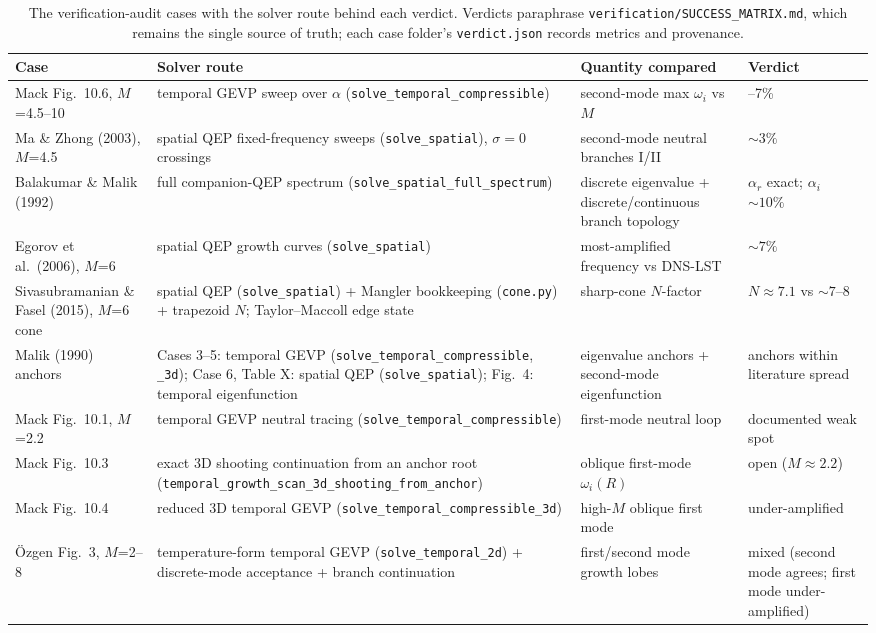 \documentclass[11pt]{article}
\begin{document}
\begin{table}[H]\centering\footnotesize
\renewcommand{\arraystretch}{1.35}
\begin{tabular}{@{}>{\raggedright\arraybackslash}p{3.4cm}>{\raggedright\arraybackslash}p{5.6cm}
>{\raggedright\arraybackslash}p{3.0cm}>{\raggedright\arraybackslash}p{2.2cm}@{}}
\toprule
\textbf{Case} & \textbf{Solver route} & \textbf{Quantity compared} & \textbf{Verdict} \\
\midrule
Mack Fig.~10.6, $M$=4.5--10 \cite{mack1984} & temporal GEVP sweep over $\alpha$
  (\texttt{solve\_temporal\_compressible}) & second-mode max $\omega_i$ vs $M$ & 1--7\% \\
Ma \& Zhong (2003), $M$=4.5 \cite{mazhong2003} & spatial QEP fixed-frequency sweeps
  (\texttt{solve\_spatial}), $\sigma=0$ crossings & second-mode neutral branches I/II &
  ${\sim}3\%$ \\
Balakumar \& Malik (1992) \cite{balakumar1992} & full companion-QEP spectrum
  (\texttt{solve\_spatial\_full\_spectrum}) & discrete eigenvalue + discrete/continuous branch
  topology & $\alpha_r$ exact; $\alpha_i$ ${\sim}10\%$ \\
Egorov et al.\ (2006), $M$=6 & spatial QEP growth curves (\texttt{solve\_spatial}) &
  most-amplified frequency vs DNS-LST & ${\sim}7\%$ \\
Sivasubramanian \& Fasel (2015), $M$=6 cone & spatial QEP (\texttt{solve\_spatial}) + Mangler
  bookkeeping (\texttt{cone.py}) + trapezoid $N$; Taylor--Maccoll edge state & sharp-cone
  $N$-factor & $N\approx7.1$ vs ${\sim}7$--$8$ \\
Malik (1990) anchors \cite{malik1990} & Cases 3--5: temporal GEVP
  (\texttt{solve\_temporal\_compressible}, \texttt{\_3d}); Case 6, Table X: spatial QEP
  (\texttt{solve\_spatial}); Fig.~4: temporal eigenfunction & eigenvalue anchors +
  second-mode eigenfunction & anchors within literature spread \\
Mack Fig.~10.1, $M$=2.2 \cite{mack1984} & temporal GEVP neutral tracing
  (\texttt{solve\_temporal\_compressible}) & first-mode neutral loop & documented weak spot \\
Mack Fig.~10.3 \cite{mack1984} & exact 3D shooting continuation from an anchor root
  (\texttt{temporal\_growth\_scan\_3d\_shooting\_from\_anchor}) & oblique first-mode
  $\omega_i(R)$ & open ($M{\approx}2.2$) \\
Mack Fig.~10.4 \cite{mack1984} & reduced 3D temporal GEVP
  (\texttt{solve\_temporal\_compressible\_3d}) & high-$M$ oblique first mode & under-amplified \\
\"Ozgen Fig.~3, $M$=2--8 \cite{ozgen2008} & temperature-form temporal GEVP
  (\texttt{solve\_temporal\_2d}) + discrete-mode acceptance + branch continuation & first/second
  mode growth lobes & mixed (second mode agrees; first mode under-amplified) \\
\bottomrule
\end{tabular}
\caption{The verification-audit cases with the solver route behind each verdict. Verdicts
paraphrase \texttt{verification/SUCCESS\_MATRIX.md}, which remains the single source of truth;
each case folder's \texttt{verdict.json} records metrics and provenance.}
\label{tab:auditmap}
\end{table}
\end{document}
